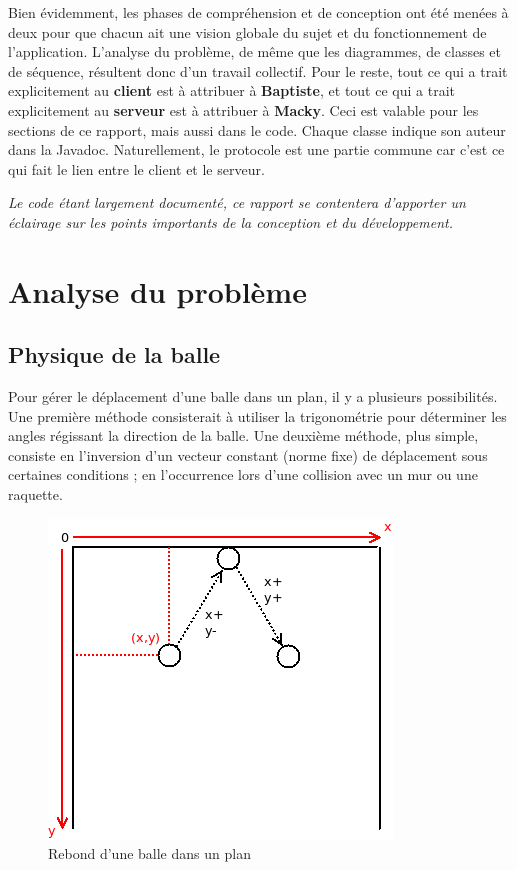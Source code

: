 \documentclass[a4paper,12pt]{article}
\begin{document}
Bien évidemment, les phases de compréhension et de conception ont été menées à deux pour que chacun ait une vision globale du sujet et du fonctionnement de l'application. L'analyse du problème, de même que les diagrammes, de classes et de séquence, résultent donc d'un travail collectif. Pour le reste, tout ce qui a trait explicitement au \textbf{client} est à attribuer à \textbf{Baptiste}, et tout ce qui a trait explicitement au \textbf{serveur} est à attribuer à \textbf{Macky}. Ceci est valable pour les sections de ce rapport, mais aussi dans le code. Chaque classe indique son auteur dans la Javadoc. Naturellement, le protocole est une partie commune car c'est ce qui fait le lien entre le client et le serveur.

\textit{Le code étant largement documenté, ce rapport se contentera d'apporter un éclairage sur les points importants de la conception et du développement.}

\newpage

\section{Analyse du problème}

\subsection{Physique de la balle}

Pour gérer le déplacement d'une balle dans un plan, il y a plusieurs possibilités. Une première méthode consisterait à utiliser la trigonométrie pour déterminer les angles régissant la direction de la balle. Une deuxième méthode, plus simple, consiste en l'inversion d'un vecteur constant (norme fixe) de déplacement sous certaines conditions ; en l'occurrence lors d'une collision avec un mur ou une raquette.

\begin{figure}[h]
 \begin{center}
  \includegraphics[scale=.5]{balle.png}
 \end{center}
 \caption{Rebond d'une balle dans un plan}
\end{figure}
\end{document}
